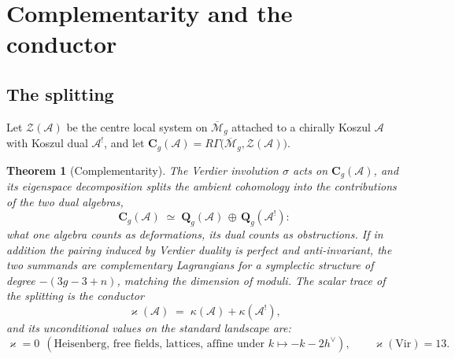 \documentclass[11pt]{amsart}
\numberwithin{equation}{section}
\theoremstyle{plain}
\newtheorem{theorem}{Theorem}[section]
\theoremstyle{definition}
\theoremstyle{remark}
\newcommand{\cA}{\mathcal{A}}
\newcommand{\cM}{\mathcal{M}}
\newcommand{\cZ}{\mathcal{Z}}
\newcommand{\Vir}{\mathrm{Vir}}
\newcommand{\dvee}{h^{\vee}}
\newcommand{\Mbar}{\overline{\cM}}
\begin{document}
\section{Complementarity and the conductor}\label{sec:conductor}

\subsection{The splitting}

Let $\cZ(\cA)$ be the centre local system on $\Mbar_{g}$ attached to a
chirally Koszul $\cA$ with Koszul dual $\cA^{!}$, and let
$\mathbf{C}_g(\cA)=R\Gamma\bigl(\Mbar_g,\cZ(\cA)\bigr)$.

\begin{theorem}[Complementarity]\label{thm:complementarity}
The Verdier involution $\sigma$ acts on $\mathbf{C}_g(\cA)$, and its
eigenspace decomposition splits the ambient cohomology into the
contributions of the two dual algebras,
\begin{equation}
\mathbf{C}_g(\cA)\;\simeq\;\mathbf{Q}_g(\cA)\,\oplus\,\mathbf{Q}_g(\cA^{!}):
\end{equation}
what one algebra counts as deformations, its dual counts as obstructions.
If in addition the pairing induced by Verdier duality is perfect and
anti-invariant, the two summands are complementary Lagrangians for a
symplectic structure of degree $-(3g-3+n)$, matching the dimension of
moduli. The scalar trace of the splitting is the \emph{conductor}
\begin{equation}\label{eq:conductor}
\varkappa(\cA)\;=\;\kappa(\cA)+\kappa(\cA^{!}),
\end{equation}
and its unconditional values on the standard landscape are:
\begin{equation}\label{eq:conductor-values}
\varkappa=0 \ \ (\text{Heisenberg, free fields, lattices, affine
under } k\mapsto-k-2\dvee),
\qquad
\varkappa(\Vir)=13 .
\end{equation}
\end{theorem}
\end{document}

